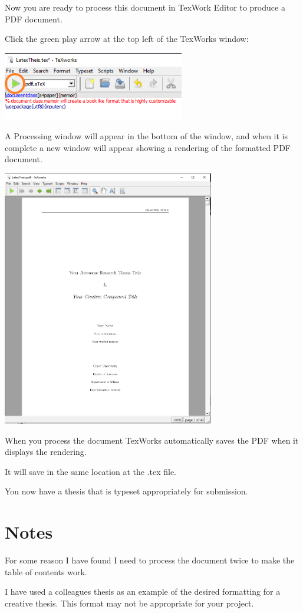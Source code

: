 \documentclass{article}
\begin{document}
Now you are ready to process this document in TexWork Editor to produce a PDF document.

Click the green play arrow at the top left of the TexWorks window:

\includegraphics[width=300px]{images/tex009.PNG}


A Processing window will appear in the bottom of the window, and when it is complete a new window will appear showing a rendering of the formatted PDF document.

\includegraphics[width=350px]{images/tex010.PNG}

When you process the document TexWorks automatically saves the PDF when it displays the rendering.

It will save in the same location at the .tex file.

You now have a thesis  that is typeset appropriately for submission.

\section{Notes}

For some reason I have found I need to process the document twice to make the table of contents work. 

I have used a colleagues thesis as an example of the desired formatting for a creative thesis. This format may not be appropriate for your project.
\end{document}
